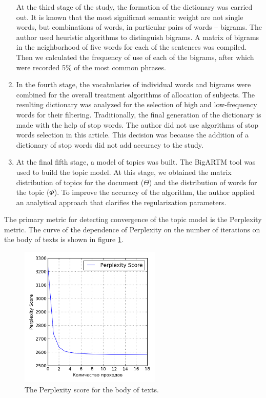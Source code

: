 \documentclass[12pt]{report}
\theoremstyle{definition}
\begin{document}
\begin{enumerate}
	At the third stage of the study, the formation of the dictionary was carried out. 
	It is known that the most significant semantic weight are not single words, but combinations of words, in particular pairs of words – bigrams. 
	The author used heuristic algorithms to distinguish bigrams. 
	A matrix of bigrams in the neighborhood of five words for each of the sentences was compiled. 
	Then we calculated the frequency of use of each of the bigrams, after which were recorded 5\% of the most common phrases.
	\item
	In the fourth stage, the vocabularies of individual words and bigrams were combined for the overall treatment algorithms of allocation of subjects. 
	The resulting dictionary was analyzed for the selection of high and low-frequency words for their filtering. 
	Traditionally, the final generation of the dictionary is made with the help of stop words. 
	The author did not use algorithms of stop words selection in this article. 
	This decision was because the addition of a dictionary of stop words did not add accuracy to the study.
	\item 
	At the final fifth stage, a model of topics was built. 
	The BigARTM \cite{ianina2017multi} tool was used to build the topic model. 
	At this stage, we obtained the matrix distribution of topics for the document ($\Theta$) and the distribution of words for the topic ($\Phi$). 
	To improve the accuracy of the algorithm, the author applied an analytical approach that clarifies the regularization parameters.
\end{enumerate}

The primary metric for detecting convergence of the topic model is the Perplexity metric. 
The curve of the dependence of Perplexity on the number of iterations on the body of texts is shown in figure \ref{fig:nx1}.

\begin{figure}[ht]
	\centering
	\includegraphics[width=0.6\textwidth]{nx1}
	\caption{The Perplexity score for the body of texts.}
	\label{fig:nx1}
\end{figure}  
\end{document}
